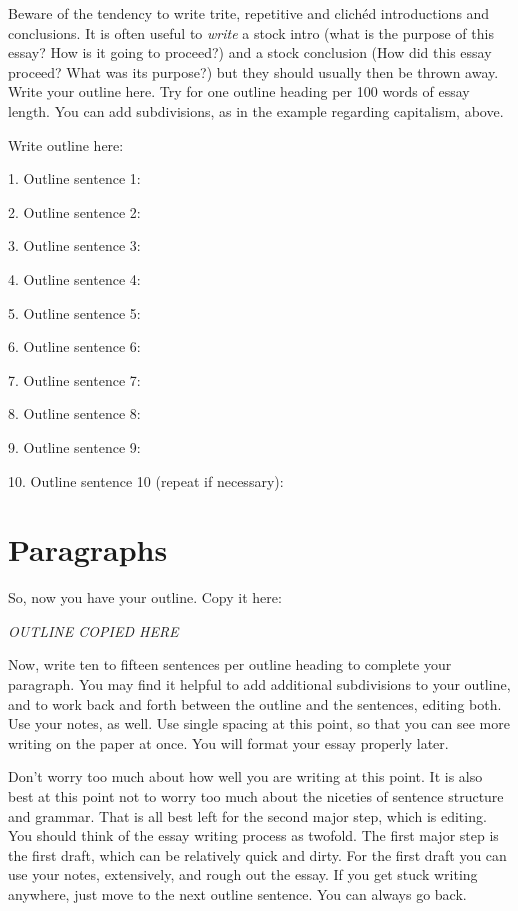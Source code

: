 \documentclass{article}
\begin{document}
Beware of the tendency to write trite, repetitive and clichéd
introductions and conclusions. It is often useful to \emph{write} a
stock intro (what is the purpose of this essay? How is it going to
proceed?) and a stock conclusion (How did this essay proceed? What was
its purpose?) but they should usually then be thrown away. Write your
outline here. Try for one outline heading per 100 words of essay length.
You can add subdivisions, as in the example regarding capitalism, above.

Write outline here:

1. Outline sentence 1:

2. Outline sentence 2:

3. Outline sentence 3:

4. Outline sentence 4:

5. Outline sentence 5:

6. Outline sentence 6:

7. Outline sentence 7:

8. Outline sentence 8:

9. Outline sentence 9:

10. Outline sentence 10 (repeat if necessary):

\textbf{\hfill\break}

\section{Paragraphs}

So, now you have your outline. Copy it here:

\emph{OUTLINE COPIED HERE}

Now, write ten to fifteen sentences per outline heading to complete your
paragraph. You may find it helpful to add additional subdivisions to
your outline, and to work back and forth between the outline and the
sentences, editing both. Use your notes, as well. Use single spacing at
this point, so that you can see more writing on the paper at once. You
will format your essay properly later.

Don't worry too much about how well you are writing at this point. It is
also best at this point not to worry too much about the niceties of
sentence structure and grammar. That is all best left for the second
major step, which is editing. You should think of the essay writing
process as twofold. The first major step is the first draft, which can
be relatively quick and dirty. For the first draft you can use your
notes, extensively, and rough out the essay. If you get stuck writing
anywhere, just move to the next outline sentence. You can always go
back.
\end{document}
